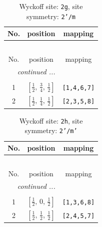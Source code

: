 \documentclass[fleqn,8pt]{jsarticle}
\begin{document}
\begin{longtable}{ccc}
\caption{Wyckoff site: {\tt 2g}, site symmetry: {\tt 2'/m}}
 \\
 \hline \hline
No. & position & mapping \\ \hline \endfirsthead

\multicolumn{2}{l}{\tablename\ \thetable{}} \\
 \hline \hline
No. & position & mapping \\ \hline \endhead

 \hline \hline
\multicolumn{2}{r}{\footnotesize\it continued ...} \\ \endfoot

 \hline \hline
\multicolumn{2}{r}{} \\ \endlastfoot

1 & $\left[ \frac{1}{2},\, \frac{3}{4},\, \frac{1}{2} \right]$ & {\tt [1,4,6,7]} \\ \hline
2 & $\left[ \frac{1}{2},\, \frac{1}{4},\, \frac{1}{2} \right]$ & {\tt [2,3,5,8]} \\
\end{longtable}
\renewcommand{\arraystretch}{1.2}
\begin{longtable}{ccc}
\caption{Wyckoff site: {\tt 2h}, site symmetry: {\tt 2'/m'}}
 \\
 \hline \hline
No. & position & mapping \\ \hline \endfirsthead

\multicolumn{2}{l}{\tablename\ \thetable{}} \\
 \hline \hline
No. & position & mapping \\ \hline \endhead

 \hline \hline
\multicolumn{2}{r}{\footnotesize\it continued ...} \\ \endfoot

 \hline \hline
\multicolumn{2}{r}{} \\ \endlastfoot

1 & $\left[ \frac{1}{2},\, 0,\, \frac{1}{2} \right]$ & {\tt [1,3,6,8]} \\ \hline
2 & $\left[ \frac{1}{2},\, \frac{1}{2},\, \frac{1}{2} \right]$ & {\tt [2,4,5,7]} \\
\end{longtable}
\renewcommand{\arraystretch}{1.2}
\end{document}
